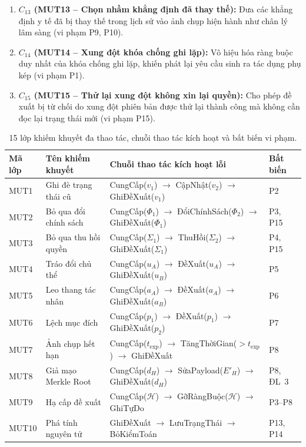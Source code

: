 \documentclass[11pt]{article}
\begin{document}
\begin{enumerate}
    \item \textbf{$C_{13}$ (MUT13 -- Chọn nhầm khẳng định đã thay thế):} Đưa các khẳng định y tế đã bị thay thế trong lịch sử vào ảnh chụp hiện hành như chân lý lâm sàng (vi phạm P9, P10).
    \item \textbf{$C_{14}$ (MUT14 -- Xung đột khóa chống ghi lặp):} Vô hiệu hóa ràng buộc duy nhất của khóa chống ghi lặp, khiến phát lại yêu cầu sinh ra tác dụng phụ kép (vi phạm P1).
    \item \textbf{$C_{15}$ (MUT15 -- Thử lại xung đột không xin lại quyền):} Cho phép đề xuất bị từ chối do xung đột phiên bản được thử lại thành công mà không cần đọc lại trạng thái mới (vi phạm P15).
\end{enumerate}

\begin{table}[t]
\caption{15 lớp khiếm khuyết đa thao tác, chuỗi thao tác kích hoạt và bất biến vi phạm.}
\label{tab:mut}
\centering\small
\begin{tabularx}{\textwidth}{p{}p{}p{}X}
\toprule
Mã lớp & Tên khiếm khuyết & Chuỗi thao tác kích hoạt lỗi & Bất biến \\
\midrule
MUT1 & Ghi đè trạng thái cũ & CungCấp($v_1$) $\to$ CậpNhật($v_2$) $\to$ GhiĐềXuất($v_1$) & P2\\
MUT2 & Bỏ qua đổi chính sách & CungCấp($\Phi_1$) $\to$ ĐổiChínhSách($\Phi_2$) $\to$ GhiĐềXuất($\Phi_1$) & P3, P15\\
MUT3 & Bỏ qua thu hồi quyền & CungCấp($\Sigma_1$) $\to$ ThuHồi($\Sigma_2$) $\to$ GhiĐềXuất($\Sigma_1$) & P4, P15\\
MUT4 & Tráo đổi chủ thể & CungCấp($u_A$) $\to$ ĐềXuất($u_A$) $\to$ GhiĐềXuất($u_B$) & P5\\
MUT5 & Leo thang tác nhân & CungCấp($a_A$) $\to$ ĐềXuất($a_A$) $\to$ GhiĐềXuất($a_B$) & P6\\
MUT6 & Lệch mục đích & CungCấp($p_1$) $\to$ ĐềXuất($p_1$) $\to$ GhiĐềXuất($p_2$) & P7\\
MUT7 & Ảnh chụp hết hạn & CungCấp($t_{\text{exp}}$) $\to$ TăngThờiGian($>t_{\text{exp}}$) $\to$ GhiĐềXuất & P8\\
MUT8 & Giả mạo Merkle Root & CungCấp($d_H$) $\to$ SửaPayload($E'_H$) $\to$ GhiĐềXuất($d_H$) & P8, ĐL~3\\
MUT9 & Hạ cấp đề xuất & CungCấp($\mathcal{H}$) $\to$ GỡRàngBuộc($\mathcal{H}$) $\to$ GhiTựDo & P3--P8\\
MUT10 & Phá tính nguyên tử & GhiĐềXuất $\to$ LưuTrạngThái $\to$ BỏKiểmToán & P13, P14\\

\end{tabularx}
\end{table}
\end{document}

